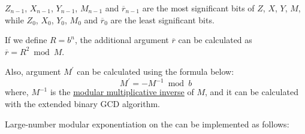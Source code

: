 \documentclass[main\_\_EN.tex]{subfiles}
\begin{document}
\begin{math}Z_{n-1}\end{math},
\begin{math}X_{n-1}\end{math},
\begin{math}Y_{n-1}\end{math},
\begin{math}M_{n-1}\end{math} and
\begin{math}\overline{r}_{n-1}\end{math} are the most significant bits of
\begin{math}Z\end{math},
\begin{math}X\end{math},
\begin{math}Y\end{math},
\begin{math}M\end{math}, while
\begin{math}Z_{0}\end{math},
\begin{math}X_{0}\end{math},
\begin{math}Y_{0}\end{math},
\begin{math}M_{0}\end{math} and
\begin{math}\overline{r}_{0}\end{math} are the least significant bits.

If we define \begin{math}R = b^{n}\end{math}, the additional argument $\overline{r}$ can be calculated as \begin{math}\overline{r} = R^{2} \bmod M\end{math}.

Also, argument $M^{\prime}$ can be calculated using the formula below:
\[
 M^{\prime} = - M^{-1} \bmod b
\]
where, $M^{-1}$ is the \href{https://en.wikipedia.org/wiki/Modular\_multiplicative\_inverse}{modular multiplicative inverse} of $M$, and it can be calculated with the extended binary GCD algorithm.

Large-number modular exponentiation on the \chipname{} can be implemented as follows:
\end{document}
